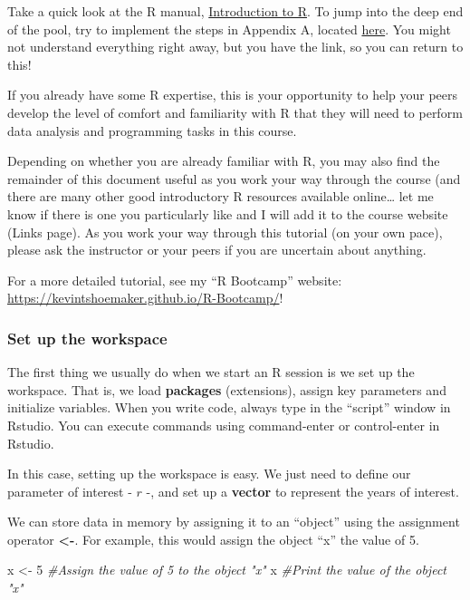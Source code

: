 \documentclass[
]{article}
\newenvironment{Shaded}{\begin{snugshade}}{\end{snugshade}}
\newcommand{\CommentTok}[1]{\textcolor[rgb]{0.56,0.35,0.01}{\textit{#1}}}
\newcommand{\DecValTok}[1]{\textcolor[rgb]{0.00,0.00,0.81}{#1}}
\newcommand{\NormalTok}[1]{#1}
\newcommand{\OtherTok}[1]{\textcolor[rgb]{0.56,0.35,0.01}{#1}}
\begin{document}
Take a quick look at the R manual,
\href{http://cran.r-project.org/doc/manuals/R-intro.html}{Introduction
to R}. To jump into the deep end of the pool, try to implement the steps
in Appendix A, located
\href{http://cran.r-project.org/doc/manuals/R-intro.html\#A-sample-session}{here}.
You might not understand everything right away, but you have the link,
so you can return to this!

If you already have some R expertise, this is your opportunity to help
your peers develop the level of comfort and familiarity with R that they
will need to perform data analysis and programming tasks in this course.

Depending on whether you are already familiar with R, you may also find
the remainder of this document useful as you work your way through the
course (and there are many other good introductory R resources available
online\ldots{} let me know if there is one you particularly like and I
will add it to the course website (Links page). As you work your way
through this tutorial (on your own pace), please ask the instructor or
your peers if you are uncertain about anything.

For a more detailed tutorial, see my ``R Bootcamp'' website:
\url{https://kevintshoemaker.github.io/R-Bootcamp/}!

\hypertarget{set-up-the-workspace}{%
\subsubsection{Set up the workspace}\label{set-up-the-workspace}}

The first thing we usually do when we start an R session is we set up
the workspace. That is, we load \textbf{packages} (extensions), assign
key parameters and initialize variables. When you write code, always
type in the ``script'' window in Rstudio. You can execute commands using
command-enter or control-enter in Rstudio.

In this case, setting up the workspace is easy. We just need to define
our parameter of interest - \(r\) -, and set up a \textbf{vector} to
represent the years of interest.

We can store data in memory by assigning it to an ``object'' using the
assignment operator \textbf{\textless-}. For example, this would assign
the object ``x'' the value of 5.

\begin{Shaded}
\begin{Highlighting}[]
\NormalTok{x }\OtherTok{\textless{}{-}} \DecValTok{5}     \CommentTok{\#Assign the value of 5 to the object "x"}
\NormalTok{x          }\CommentTok{\#Print the value of the object "x"}
\end{Highlighting}
\end{Shaded}
\end{document}
